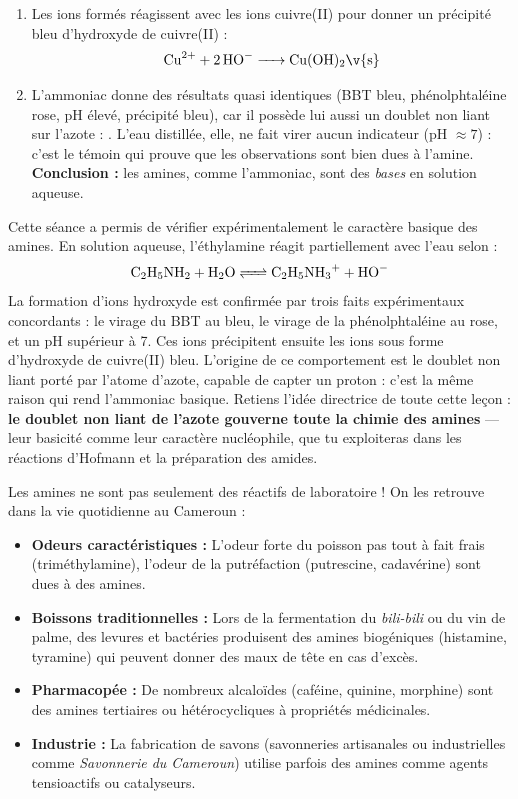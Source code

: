 \documentclass[11pt]{article}
\newcommand{\cle}[1]{{\popxbold\color{popdark}#1}}
\newcounter{popsec}
\newcounter{popsub}
\newcommand{\courssub}[1]{%
  \stepcounter{popsub}%
  \par\vspace{9pt}\noindent{\popxbold\fontsize{11.5}{13}\selectfont\color{popink}{\color{poporange}\thepopsec.\thepopsub}\hspace{6pt}#1}\par\nopagebreak\vspace{4pt}
}
\begin{document}
\begin{exoresolu}
\begin{enumerate}
\item Les ions  formés réagissent avec les ions cuivre(II) pour donner un précipité bleu d'hydroxyde de cuivre(II) :
\[ \ce{Cu^2+ + 2 HO- -> Cu(OH)2\v{s}} \]
\item L'ammoniac donne des résultats quasi identiques (BBT bleu, phénolphtaléine rose, pH élevé, précipité bleu), car il possède lui aussi un doublet non liant sur l'azote : . L'eau distillée, elle, ne fait virer aucun indicateur (pH $\approx 7$) : c'est le témoin qui prouve que les observations sont bien dues à l'amine. \textbf{Conclusion :} les amines, comme l'ammoniac, sont des \emph{bases} en solution aqueuse.
\end{enumerate}
\end{exoresolu}

\courssub{Conclusion}

Cette séance a permis de vérifier expérimentalement le \cle{caractère basique des amines}. En solution aqueuse, l'éthylamine réagit partiellement avec l'eau selon :
\[ \ce{C2H5NH2 + H2O <=> C2H5NH3+ + HO-} \]
La formation d'ions hydroxyde  est confirmée par trois faits expérimentaux concordants : le virage du BBT au bleu, le virage de la phénolphtaléine au rose, et un pH supérieur à 7. Ces ions  précipitent ensuite les ions  sous forme d'hydroxyde de cuivre(II) bleu. L'origine de ce comportement est le \cle{doublet non liant} porté par l'atome d'azote, capable de capter un proton : c'est la même raison qui rend l'ammoniac basique. Retiens l'idée directrice de toute cette leçon : \textbf{le doublet non liant de l'azote gouverne toute la chimie des amines} — leur basicité comme leur caractère nucléophile, que tu exploiteras dans les réactions d'Hofmann et la préparation des amides.

\begin{savaistu}
Les amines ne sont pas seulement des réactifs de laboratoire ! On les retrouve dans la vie quotidienne au Cameroun :
\begin{itemize}
\item \textbf{Odeurs caractéristiques :} L'odeur forte du poisson pas tout à fait frais (triméthylamine), l'odeur de la putréfaction (putrescine, cadavérine) sont dues à des amines.
\item \textbf{Boissons traditionnelles :} Lors de la fermentation du \emph{bili-bili} ou du vin de palme, des levures et bactéries produisent des amines biogéniques (histamine, tyramine) qui peuvent donner des maux de tête en cas d'excès.
\item \textbf{Pharmacopée :} De nombreux alcaloïdes (caféine, quinine, morphine) sont des amines tertiaires ou hétérocycliques à propriétés médicinales.
\item \textbf{Industrie :} La fabrication de savons (savonneries artisanales ou industrielles comme \emph{Savonnerie du Cameroun}) utilise parfois des amines comme agents tensioactifs ou catalyseurs.
\end{itemize}
\end{savaistu}
\end{document}
